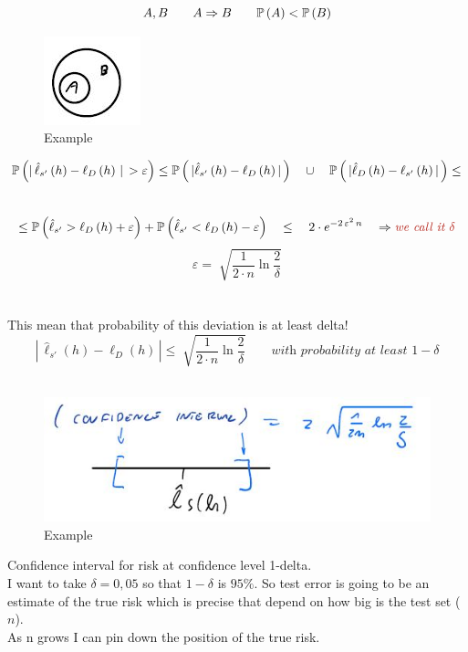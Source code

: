 \documentclass[../main.tex]{subfiles}
\begin{document}
$$
A, B \qquad A \Rightarrow B \qquad \mathbb{P} \left( A \right) < \mathbb{P} \left( B \right)
$$
\begin{figure}[h]
    \centering
    \includegraphics[width=0.2\linewidth]{../img/lez7-img2.JPG}
    \caption{Example}
\end{figure}
$$
\mathbb{P} \left(|\,\hat{\ell}_{s'} \left( h \right) - \ell_D\left( h \right) \, | \, > \varepsilon \right) 
\leq
\mathbb{P} \left( \,| \hat{\ell}_{s'}\left(h\right)-\ell_D\left(h\right) |\,\right) \quad
\cup \quad
\mathbb{P} \left( \,|
\hat{\ell}_D \left(h\right)-\ell_{s'}\left(h\right) 
|\,\right) 
\leq
$$\
$$
\leq
\barra{P} \left( \hat{\ell}_{s'} > \ell_D\left(h\right) + \varepsilon \right) + \barra{P} \left( \hat{\ell}_{s'} < \ell_D\left(h\right) - \varepsilon \right) 
\quad
\leq \quad
2 \cdot e^{-2 \, \varepsilon^2 \, n} \quad \Rightarrow \red{ \textit{we call it } \delta }
$$
$$
\varepsilon = \sqrt[]{\frac{1}{2\cdot n}\ln \frac{2}{\delta
}}
$$
\\\\
This mean that probability of this deviation is at least delta!
$$
|\, \hat{\ell}_{s'}\left(h\right)-\ell_D\left(h\right) \, | \leq \sqrt[]{\frac{1}{2\cdot n} \ln \frac{2}{\delta}} \qquad \textit{with probability at least $1- \delta$}
$$
\\
\begin{figure}[h]
    \centering
    \includegraphics[width=0.5\linewidth]{../img/lez7-img3.JPG}
    \caption{Example}
\end{figure}Confidence interval for risk at confidence level 1-delta.\\
I want to take $\delta = 0,05$ so that $1 - \delta$ is $95\%$. So test error is going to be
an estimate of the true risk which is precise that depend on how big is the test
set ($n$).\\
As n grows I can pin down the position of the true risk.\\\
\end{document}
